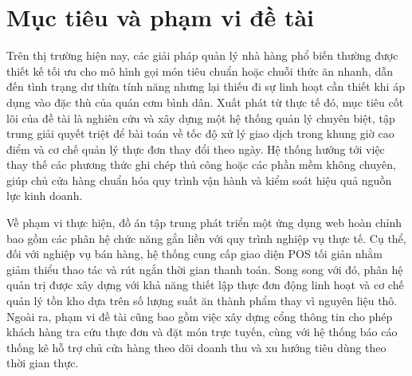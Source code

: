 \documentclass[../20232006p.tex]{subfiles}
\begin{document}
\section{Mục tiêu và phạm vi đề tài}
\label{section:1.2}
Trên thị trường hiện nay, các giải pháp quản lý nhà hàng phổ biến thường được thiết kế tối ưu cho mô hình gọi món tiêu chuẩn hoặc chuỗi thức ăn nhanh, dẫn đến tình trạng dư thừa tính năng nhưng lại thiếu đi sự linh hoạt cần thiết khi áp dụng vào đặc thù của quán cơm bình dân. Xuất phát từ thực tế đó, mục tiêu cốt lõi của đề tài là nghiên cứu và xây dựng một hệ thống quản lý chuyên biệt, tập trung giải quyết triệt để bài toán về tốc độ xử lý giao dịch trong khung giờ cao điểm và cơ chế quản lý thực đơn thay đổi theo ngày. Hệ thống hướng tới việc thay thế các phương thức ghi chép thủ công hoặc các phần mềm không chuyên, giúp chủ cửa hàng chuẩn hóa quy trình vận hành và kiểm soát hiệu quả nguồn lực kinh doanh.

Về phạm vi thực hiện, đồ án tập trung phát triển một ứng dụng web hoàn chỉnh bao gồm các phân hệ chức năng gắn liền với quy trình nghiệp vụ thực tế. Cụ thể, đối với nghiệp vụ bán hàng, hệ thống cung cấp giao diện POS tối giản nhằm giảm thiểu thao tác và rút ngắn thời gian thanh toán. Song song với đó, phân hệ quản trị được xây dựng với khả năng thiết lập thực đơn động linh hoạt và cơ chế quản lý tồn kho dựa trên số lượng suất ăn thành phẩm thay vì nguyên liệu thô. Ngoài ra, phạm vi đề tài cũng bao gồm việc xây dựng cổng thông tin cho phép khách hàng tra cứu thực đơn và đặt món trực tuyến, cùng với hệ thống báo cáo thống kê hỗ trợ chủ cửa hàng theo dõi doanh thu và xu hướng tiêu dùng theo thời gian thực.
\end{document}
